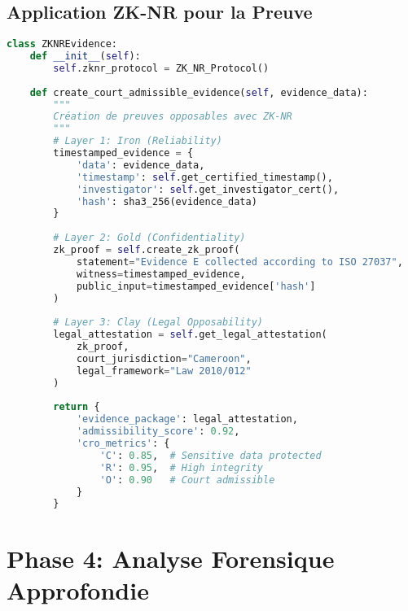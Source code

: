 \subsection{Application ZK-NR pour la Preuve}
\begin{lstlisting}[language=Python, caption=Implémentation du protocole ZK-NR pour les preuves]
class ZKNREvidence:
    def __init__(self):
        self.zknr_protocol = ZK_NR_Protocol()
    
    def create_court_admissible_evidence(self, evidence_data):
        """
        Création de preuves opposables avec ZK-NR
        """
        # Layer 1: Iron (Reliability)
        timestamped_evidence = {
            'data': evidence_data,
            'timestamp': self.get_certified_timestamp(),
            'investigator': self.get_investigator_cert(),
            'hash': sha3_256(evidence_data)
        }
        
        # Layer 2: Gold (Confidentiality)
        zk_proof = self.create_zk_proof(
            statement="Evidence E collected according to ISO 27037",
            witness=timestamped_evidence,
            public_input=timestamped_evidence['hash']
        )
        
        # Layer 3: Clay (Legal Opposability)
        legal_attestation = self.get_legal_attestation(
            zk_proof,
            court_jurisdiction="Cameroon",
            legal_framework="Law 2010/012"
        )
        
        return {
            'evidence_package': legal_attestation,
            'admissibility_score': 0.92,
            'cro_metrics': {
                'C': 0.85,  # Sensitive data protected
                'R': 0.95,  # High integrity
                'O': 0.90   # Court admissible
            }
        }
\end{lstlisting}

\section{Phase 4: Analyse Forensique Approfondie}
